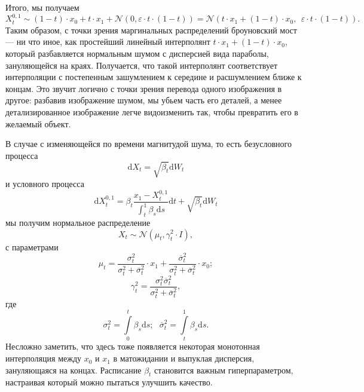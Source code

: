 \documentclass[12pt]{article}
\theoremstyle{definition}
\begin{document}
Итого, мы получаем
\[
    X_t^{0, 1} \sim (1 - t)\cdot x_0 + t \cdot x_1 + \mathcal{N}(0, \varepsilon \cdot t \cdot (1 - t)) = \mathcal{N}\left(t \cdot x_1 + (1 - t) \cdot x_0,\:\: \varepsilon \cdot t \cdot (1 - t)\right).
\]
Таким образом, с точки зрения маргинальных распределений броуновский мост --- ни что иное, как простейший линейный интерполянт $t \cdot x_1 + (1 - t) \cdot x_0$, который разбавляется нормальным шумом с дисперсией вида параболы, зануляющейся на краях. Получается, что такой интерполянт соответствует интерполяции с постепенным зашумлением к середине и расшумлением ближе к концам. Это звучит логично с точки зрения перевода одного изображения в другое: разбавив изображение шумом, мы убьем часть его деталей, а менее детализированное изображение легче видоизменить так, чтобы превратить его в желаемый объект.

В случае с изменяющейся по времени магнитудой шума, то есть безусловного процесса
\[
    \mathrm{d} X_t = \sqrt{\beta_t} \mathrm{d} W_t
\]
и условного процесса
\[
    \mathrm{d} X_t^{0, 1} = \beta_t \frac{x_1 - X_t^{0, 1}}{\int_{t}^{1} \beta_s \mathrm{d} s} \mathrm{d} t + \sqrt{\beta_t} \mathrm{d} W_t
\]
мы получим нормальное распределение
\[
    X_t \sim \mathcal{N}\left(\mu_t, \gamma^2_t \cdot I\right),
\]
с параметрами
\[
    \mu_t = \frac{\sigma^2_t}{\sigma^2_t + \overline{\sigma}^2_t} \cdot x_1 + \frac{\overline{\sigma}^2_t}{\sigma^2_t + \overline{\sigma}^2_t} \cdot x_0;
\]
\[
    \gamma^2_t = \frac{\sigma^2_t \overline{\sigma}^2_t}{\sigma^2_t + \overline{\sigma}^2_t},
\]
где
\[
    \sigma^2_t = \int\limits_{0}^{t} \beta_s \mathrm{d} s; \:\:\: \overline{\sigma}^2_t = \int\limits_{t}^{1} \beta_s \mathrm{d} s.
\]
Несложно заметить, что здесь тоже появляется некоторая монотонная интерполяция между $x_0$ и $x_1$ в матожидании и выпуклая дисперсия, зануляющаяся на концах. Расписание $\beta_t$ становится важным гиперпараметром, настраивая который можно пытаться улучшить качество.
\end{document}
